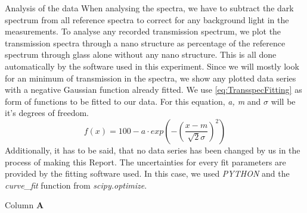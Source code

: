 \documentclass[pdftex, a4paper,11pt, twoside, UKenglish]{report}
\begin{document}
  \begin{chapter}{Analysis of the data}
    \label{chp:Analysis}
    When analysing the spectra, we have to subtract the dark spectrum from
    all reference spectra to correct for any background light in the
    measurements.
    To analyse any recorded transmission spectrum, we plot the transmission
    spectra through a nano structure as percentage of the reference spectrum
    through glass alone without any nano structure.
    This is all done automatically by the software used in this experiment.
    Since we will mostly look for an minimum of transmission in the spectra,
    we show any plotted data series with a negative Gaussian function already
    fitted. We use \cref{eq:TransspecFitting} as form of functions to be fitted
    to our data. For this equation, \textit{a, m} and \textit{$\sigma$} will be
    it's degrees of freedom.
    \begin{equation}
      \label{eq:TransspecFitting}
      f(x)=100-a\cdot exp\left(-\left(\frac{x-m}{\sqrt{2}\sigma}
      \right)^{2}\right)
    \end{equation}
    Additionally, it has to be said, that no data series has been changed by us
    in the process of making this Report. The uncertainties for every fit
    parameters are provided by the fitting software used.
    In this case, we used \textit{PYTHON} and the \textit{curve\_fit} function
    from \textit{scipy.optimize}.
    
    \newpage
    \begin{section}{Column \textbf{A}}
      \label{chp::DataA}
      
      

\end{section}
\end{chapter}
\end{document}
